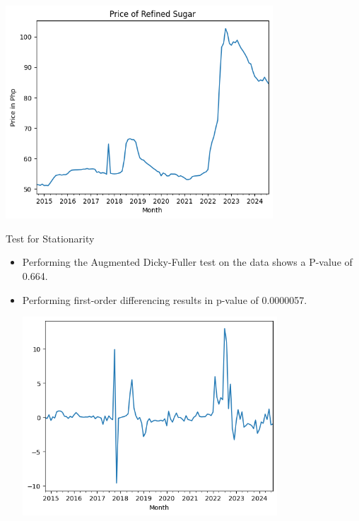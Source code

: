 \documentclass[12pt, aspectratio=169]{beamer}
\begin{document}
\begin{frame}
    \begin{center}
        \includegraphics[width=0.75\textwidth, height =\textheight]{Price_plot.png}
    \end{center}
\end{frame}

\begin{frame}{Test for Stationarity}
    \begin{itemize}
        \item Performing the Augmented Dicky-Fuller test on the data shows a P-value of 0.664. 
        \item Performing first-order differencing results in p-value of 0.0000057. 
        \begin{center}
            \includegraphics[width = 0.75\textwidth,height = .7\textheight]{differenced.png}
        \end{center}
    \end{itemize}
\end{frame}
\end{document}
